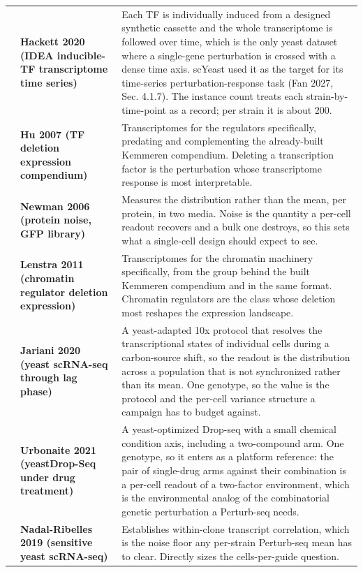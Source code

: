 \begin{longtable}{@{}r@{\hspace{4pt}} L{46mm} L{112mm}@{}}
 & \textbf{Hackett 2020 (IDEA inducible-TF transcriptome time series)} & Each TF is individually induced from a designed synthetic cassette and the whole transcriptome is followed over time, which is the only yeast dataset where a single-gene perturbation is crossed with a dense time axis. scYeast used it as the target for its time-series perturbation-response task (Fan 2027, Sec. 4.1.7). The instance count treats each strain-by-time-point as a record; per strain it is about 200. \\
 & \textbf{Hu 2007 (TF deletion expression compendium)} & Transcriptomes for the regulators specifically, predating and complementing the already-built Kemmeren compendium. Deleting a transcription factor is the perturbation whose transcriptome response is most interpretable. \\
 & \textbf{Newman 2006 (protein noise, GFP library)} & Measures the distribution rather than the mean, per protein, in two media. Noise is the quantity a per-cell readout recovers and a bulk one destroys, so this sets what a single-cell design should expect to see. \\
 & \textbf{Lenstra 2011 (chromatin regulator deletion expression)} & Transcriptomes for the chromatin machinery specifically, from the group behind the built Kemmeren compendium and in the same format. Chromatin regulators are the class whose deletion most reshapes the expression landscape. \\
 & \textbf{Jariani 2020 (yeast scRNA-seq through lag phase)} & A yeast-adapted 10x protocol that resolves the transcriptional states of individual cells during a carbon-source shift, so the readout is the distribution across a population that is not synchronized rather than its mean. One genotype, so the value is the protocol and the per-cell variance structure a campaign has to budget against. \\
 & \textbf{Urbonaite 2021 (yeastDrop-Seq under drug treatment)} & A yeast-optimized Drop-seq with a small chemical condition axis, including a two-compound arm. One genotype, so it enters as a platform reference: the pair of single-drug arms against their combination is a per-cell readout of a two-factor environment, which is the environmental analog of the combinatorial genetic perturbation a Perturb-seq needs. \\
 & \textbf{Nadal-Ribelles 2019 (sensitive yeast scRNA-seq)} & Establishes within-clone transcript correlation, which is the noise floor any per-strain Perturb-seq mean has to clear. Directly sizes the cells-per-guide question. \\

\end{longtable}
